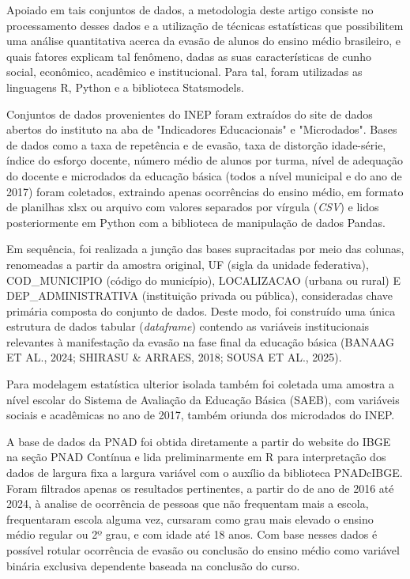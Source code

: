 \documentclass[english, spanish, brazilian]{RBIEarticle} %
\begin{document}
Apoiado em tais conjuntos de dados, a metodologia deste artigo consiste no processamento desses dados e a utilização de técnicas estatísticas que possibilitem uma análise quantitativa acerca da evasão de alunos do ensino médio brasileiro, e quais fatores explicam tal fenômeno, dadas as suas características de cunho social, econômico, acadêmico e institucional. Para tal, foram utilizadas as linguagens R, Python e a biblioteca Statsmodels.  

Conjuntos de dados provenientes do INEP foram extraídos do site de dados abertos do instituto na aba de "Indicadores Educacionais" e "Microdados". Bases de dados como a taxa de repetência e de evasão, taxa de distorção idade-série, índice do esforço docente, número médio de alunos por turma, nível de adequação do docente e microdados da educação básica (todos a nível municipal e do ano de 2017) foram coletados, extraindo apenas ocorrências do ensino médio, em formato de planilhas xlsx ou arquivo com valores separados por vírgula (\textit{CSV}) e lidos posteriormente em Python com a biblioteca de manipulação de dados Pandas.

Em sequência, foi realizada a junção das bases supracitadas por meio das colunas, renomeadas a partir da amostra original, UF (sigla da unidade federativa), COD\_MUNICIPIO (código do município), LOCALIZACAO (urbana ou rural) E DEP\_ADMINISTRATIVA (instituição privada ou pública), consideradas chave primária composta do conjunto de dados. Deste modo, foi construído uma única estrutura de dados tabular (\textit{dataframe}) contendo as variáveis institucionais relevantes à manifestação da evasão na fase final da educação básica (BANAAG ET AL., 2024; SHIRASU \& ARRAES, 2018; SOUSA ET AL., 2025). 

Para modelagem estatística ulterior isolada também foi coletada uma amostra a nível escolar do Sistema de Avaliação da Educação Básica (SAEB), com variáveis sociais e acadêmicas no ano de 2017, também oriunda dos microdados do INEP.

A base de dados da PNAD foi obtida diretamente a partir do website do IBGE na seção PNAD Contínua e lida preliminarmente em R para interpretação dos dados de largura fixa a largura variável com o auxílio da biblioteca PNADcIBGE. Foram filtrados apenas os resultados pertinentes, a partir do de ano de 2016 até 2024, à analise de ocorrência de pessoas que não frequentam mais a escola, frequentaram escola alguma vez, cursaram como grau mais elevado o ensino médio regular ou 2º grau, e com idade até 18 anos. Com base nesses dados é possível rotular ocorrência de evasão ou conclusão do ensino médio como variável binária exclusiva dependente baseada na conclusão do curso.
\end{document}
